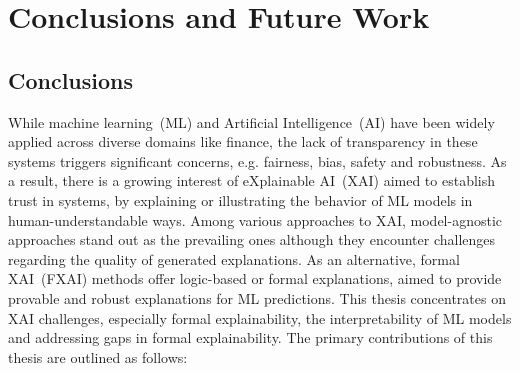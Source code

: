 \chapter{Conclusions and Future Work}\label{chap:conc}

\section*{Conclusions}

%

While machine learning~(ML) and Artificial Intelligence~(AI)  have been 
widely applied across diverse domains like finance, 
the lack of transparency in these systems triggers significant concerns, 
e.g. fairness, bias, safety and robustness.
%
As a result, there is a growing interest of eXplainable AI~(XAI) aimed to establish trust in  
systems, by explaining or illustrating the behavior of ML models in 
human-understandable ways.
%
Among various approaches to XAI, model-agnostic approaches
stand out as the prevailing ones although they encounter challenges regarding 
the quality of generated explanations. 
%
As an alternative, formal XAI~(FXAI) methods offer logic-based or formal explanations, 
aimed to provide provable and robust explanations for ML predictions.
%
This thesis concentrates on XAI challenges, especially formal explainability,
 the interpretability of ML models
and addressing gaps in formal explainability.
%
The primary contributions of this thesis are outlined as follows:

